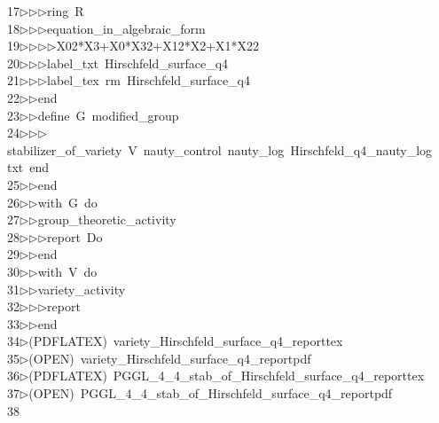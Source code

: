 \begin{tabbing}
17\>$\triangleright$\>$\triangleright$\>$\triangleright$\>ring\ R\ \\[0pt]
18\>$\triangleright$\>$\triangleright$\>$\triangleright$\>equation\_in\_algebraic\_form\ \\[0pt]
19\>$\triangleright$\>$\triangleright$\>$\triangleright$\>$\triangleright$\>X02*X3+X0*X32+X12*X2+X1*X22\ \\[0pt]
20\>$\triangleright$\>$\triangleright$\>$\triangleright$\>label\_txt\ Hirschfeld\_surface\_q4\ \\[0pt]
21\>$\triangleright$\>$\triangleright$\>$\triangleright$\>label\_tex\ rm\ Hirschfeld\_surface\_q4\ \\[0pt]
22\>$\triangleright$\>$\triangleright$\>end\ \\[0pt]
23\>$\triangleright$\>$\triangleright$\>define\ G\ modified\_group\ \\[0pt]
24\>$\triangleright$\>$\triangleright$\>$\triangleright$\>stabilizer\_of\_variety\ V\ nauty\_control\ nauty\_log\ Hirschfeld\_q4\_nauty\_log\\[0pt]
\>txt\ end\ \\[0pt]
25\>$\triangleright$\>$\triangleright$\>end\ \\[0pt]
26\>$\triangleright$\>$\triangleright$\>with\ G\ do\ \\[0pt]
27\>$\triangleright$\>$\triangleright$\>group\_theoretic\_activity\ \\[0pt]
28\>$\triangleright$\>$\triangleright$\>$\triangleright$\>report\ Do\ \\[0pt]
29\>$\triangleright$\>$\triangleright$\>end\ \\[0pt]
30\>$\triangleright$\>$\triangleright$\>with\ V\ do\ \\[0pt]
31\>$\triangleright$\>$\triangleright$\>variety\_activity\ \\[0pt]
32\>$\triangleright$\>$\triangleright$\>$\triangleright$\>report\ \\[0pt]
33\>$\triangleright$\>$\triangleright$\>end\\[0pt]
34\>$\triangleright$\>(PDFLATEX)\ variety\_Hirschfeld\_surface\_q4\_reporttex\\[0pt]
35\>$\triangleright$\>(OPEN)\ variety\_Hirschfeld\_surface\_q4\_reportpdf\\[0pt]
36\>$\triangleright$\>(PDFLATEX)\ PGGL\_4\_4\_stab\_of\_Hirschfeld\_surface\_q4\_reporttex\\[0pt]
37\>$\triangleright$\>(OPEN)\ PGGL\_4\_4\_stab\_of\_Hirschfeld\_surface\_q4\_reportpdf\\[0pt]
38\>\end{tabbing}
